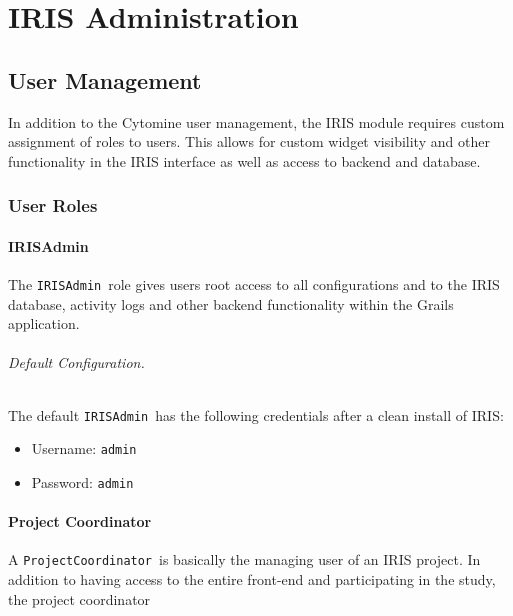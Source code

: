 \part{IRIS Administration}
\label{part:irisadmin}
{
\hypersetup{linkcolor=black}
\parttoc
}

\chapter{User Management}
In addition to the Cytomine user management, the IRIS module requires custom assignment of roles to users. 
This allows for custom widget visibility and other functionality in the IRIS interface as well as access to backend and database. 

\def\irisadmin{\texttt{IRISAdmin}}
\def\pjcoord{\texttt{ProjectCoordinator}}
\section{User Roles}
\subsection{IRISAdmin}
The \irisadmin\ role gives users root access to all configurations and to the IRIS database, activity logs and other backend functionality within the Grails application.  

\noindent 

\paragraph{Default Configuration.} 
The default \irisadmin\ has the following credentials after a clean install of IRIS:
\begin{itemize}
\item Username: \texttt{admin}
\item Password: \texttt{admin}
\end{itemize}


\subsection{Project Coordinator}
A \pjcoord\ is basically the managing user of an IRIS project. 
In addition to having access to the entire front-end and participating in the study, the project coordinator 


